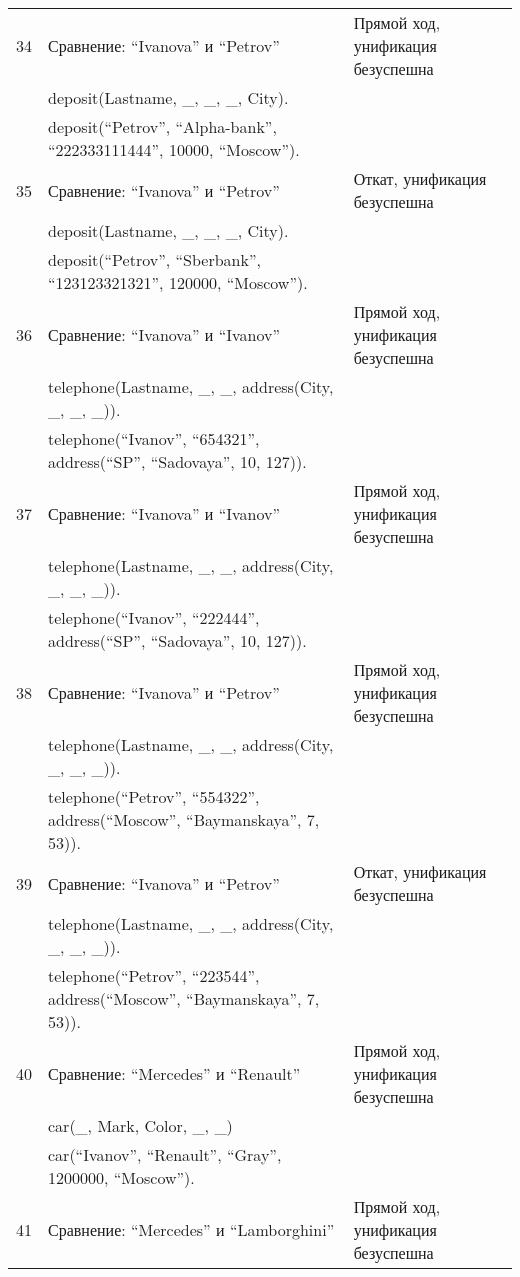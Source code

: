 {\begin{longtable}{|p{1.15cm}|p{8cm}|p{8cm}|}
    \hline
    34 & Сравнение: ``Ivanova'' и ``Petrov'' & Прямой ход, унификация безуспешна \\
       & deposit(Lastname, \_, \_, \_, City). & \\
       & deposit(``Petrov'', ``Alpha-bank'', ``222333111444'', 10000, ``Moscow''). & \\
    \hline
    35 & Сравнение: ``Ivanova'' и ``Petrov'' & Откат, унификация безуспешна \\
       & deposit(Lastname, \_, \_, \_, City). & \\
       & deposit(``Petrov'', ``Sberbank'', ``123123321321'', 120000, ``Moscow''). & \\
    \hline
    36 & Сравнение: ``Ivanova'' и ``Ivanov'' & Прямой ход, унификация безуспешна \\
      & telephone(Lastname, \_, \_, address(City, \_, \_, \_)). & \\
      & telephone(``Ivanov'', ``654321'', address(``SP'', ``Sadovaya'', 10, 127)). & \\
    \hline
    37 & Сравнение: ``Ivanova'' и ``Ivanov'' & Прямой ход, унификация безуспешна \\
      & telephone(Lastname, \_, \_, address(City, \_, \_, \_)). & \\
      & telephone(``Ivanov'', ``222444'', address(``SP'', ``Sadovaya'', 10, 127)). & \\
    \hline
    38 & Сравнение: ``Ivanova'' и ``Petrov'' & Прямой ход, унификация безуспешна \\
      & telephone(Lastname, \_, \_, address(City, \_, \_, \_)). & \\
      & telephone(``Petrov'', ``554322'', address(``Moscow'', ``Baymanskaya'', 7, 53)). & \\
    \hline
    39 & Сравнение: ``Ivanova'' и ``Petrov'' & Откат, унификация безуспешна \\
      & telephone(Lastname, \_, \_, address(City, \_, \_, \_)). & \\
      & telephone(``Petrov'', ``223544'', address(``Moscow'', ``Baymanskaya'', 7, 53)). & \\
    \hline
    40 & Сравнение: ``Mercedes'' и ``Renault'' & Прямой ход, унификация безуспешна \\
       & car(\_, Mark, Color, \_, \_) & \\
       & car(``Ivanov'', ``Renault'', ``Gray'', 1200000, ``Moscow''). & \\
    \hline
    41 & Сравнение: ``Mercedes'' и ``Lamborghini'' & Прямой ход, унификация безуспешна \\

\end{longtable}}
